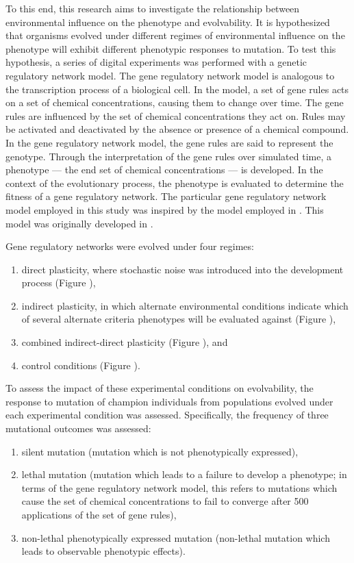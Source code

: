 To this end, this research aims to investigate the relationship between environmental influence on the phenotype and evolvability.
It is hypothesized that organisms evolved under different regimes of environmental influence on the phenotype will exhibit different phenotypic responses to mutation.
To test this hypothesis, a series of digital experiments was performed with a genetic regulatory network model.
The gene regulatory network model is analogous to the transcription process of a biological cell.
In the model, a set of gene rules acts on a set of chemical concentrations, causing them to change over time.
The gene rules are influenced by the set of chemical concentrations they act on.
Rules may be activated and deactivated by the absence or presence of a chemical compound.
In the gene regulatory network model, the gene rules are said to represent the genotype.
Through the interpretation of the gene rules over simulated time, a phenotype --- the end set of chemical concentrations --- is developed.
In the context of the evolutionary process, the phenotype is evaluated to determine the fitness of a gene regulatory network.
The particular gene regulatory network model employed in this study was inspired by the model employed in \cite{Wilder2015ReconcilingEvolvability}.
This model was originally developed in \cite{Draghi2009TheModel}.

Gene regulatory networks were evolved under four regimes:
\begin{enumerate}
\item direct plasticity, where stochastic noise was introduced into the development process (Figure ),
\item indirect plasticity, in which alternate environmental conditions indicate which of several alternate criteria phenotypes will be evaluated against (Figure ),
\item combined indirect-direct plasticity (Figure ), and
\item control conditions (Figure ).
\end{enumerate}
To assess the impact of these experimental conditions on evolvability, the response to mutation of champion individuals from populations evolved under each experimental condition was assessed.
Specifically, the frequency of three mutational outcomes was assessed:
\begin{enumerate}
\item silent mutation (mutation which is not phenotypically expressed),
\item lethal mutation (mutation which leads to a failure to develop a phenotype; in terms of the gene regulatory network model, this refers to mutations which cause the set of chemical concentrations to fail to converge after 500 applications of the set of gene rules),
\item non-lethal phenotypically expressed mutation (non-lethal mutation which leads to observable phenotypic effects).
\end{enumerate}
